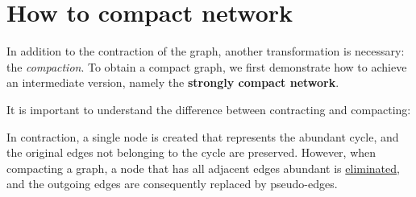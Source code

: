 \section{How to compact network}

In addition to the contraction of the graph, another transformation is necessary: the \textit{compaction}. To obtain a compact graph, we first demonstrate how to achieve an intermediate version, namely the \textbf{strongly compact network}.

It is important to understand the difference between contracting and compacting:

In contraction, a single node is created that represents the abundant cycle, and the original edges not belonging to the cycle are preserved. However, when compacting a graph, a node that has all adjacent edges abundant is \underline{eliminated}, and the outgoing edges are consequently replaced by pseudo-edges.
